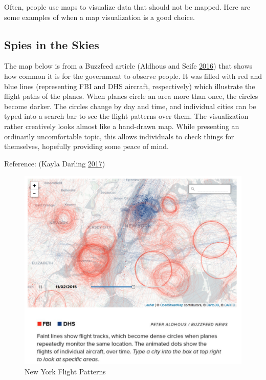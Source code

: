 \documentclass[]{book}
\theoremstyle{definition}
\theoremstyle{definition}
\theoremstyle{definition}
\theoremstyle{remark}
\begin{document}
Often, people use maps to visualize data that should not be mapped. Here
are some examples of when a map visualization is a good choice.

\subsection{Spies in the Skies}\label{spies-in-the-skies}

The map below is from a Buzzfeed article (Aldhous and Seife
\protect\hyperlink{ref-spies_sky}{2016}) that shows how common it is for
the government to observe people. It was filled with red and blue lines
(representing FBI and DHS aircraft, respectively) which illustrate the
flight paths of the planes. When planes circle an area more than once,
the circles become darker. The circles change by day and time, and
individual cities can be typed into a search bar to see the flight
patterns over them. The visualization rather creatively looks almost
like a hand-drawn map. While presenting an ordinarily uncomfortable
topic, this allows individuals to check things for themselves, hopefully
providing some peace of mind.

Reference: (Kayla Darling \protect\hyperlink{ref-cool_data}{2017})

\begin{figure}
\centering
\includegraphics{images/NYCflights.png}
\caption{New York Flight Patterns}
\end{figure}
\end{document}
